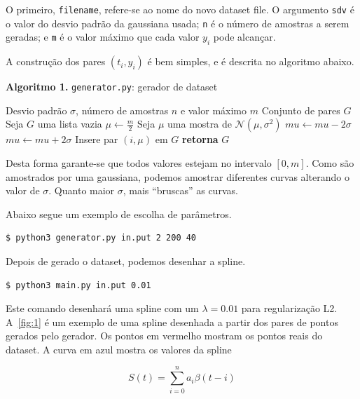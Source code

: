 \documentclass[12pt]{article}
\theoremstyle{plain}
\numberwithin{equation}{section}
\newcommand{\code}[1]{\lstinline[mathescape=true]{#1}}
\begin{document}
O primeiro, \code{filename}, refere-se ao nome do novo dataset file. O argumento \code{sdv} é o
valor do desvio padrão da gaussiana usada; \code{n} é o número de amostras a serem geradas; e
\code{m} é o valor máximo que cada valor $y_i$ pode alcançar.

A construção dos pares $(t_i,y_i)$ é bem simples, e é descrita no algoritmo abaixo.

\begin{algorithm}[h]
  \caption*{\textbf{Algoritmo 1.} \code{generator.py}: gerador de dataset}
  \begin{algorithmic}[1]
    \Require Desvio padrão $\sigma$, número de amostras $n$ e valor máximo $m$
    \Ensure Conjunto de pares $G$
    \State Seja $G$ uma lista vazia
    \State $\mu\gets \frac{m}{2}$
    \For{inteiro $i$ no intervalo $[0,n)$}
      \State Seja $\mu$ uma mostra de $\mathcal{N}(\mu,\sigma^2)$
        \State $mu\gets mu - 2\sigma$
        \State $mu\gets mu + 2\sigma$
      \EndIf
      \State Insere par $(i, \mu)$ em $G$
    \EndFor%
    \State\textbf{retorna} $G$
  \end{algorithmic}
\end{algorithm}

Desta forma garante-se que todos valores estejam no intervalo $[0, m]$. Como são amostrados por uma
gaussiana, podemos amostrar diferentes curvas alterando o valor de $\sigma$. Quanto maior $\sigma$,
mais ``bruscas'' as curvas.

Abaixo segue um exemplo de escolha de parâmetros.

\begin{lstlisting}[numbers=none]
$ python3 generator.py in.put 2 200 40
\end{lstlisting}

Depois de gerado o dataset, podemos desenhar a spline.

\begin{lstlisting}[numbers=none]
$ python3 main.py in.put 0.01
\end{lstlisting}

Este comando desenhará uma spline com um $\lambda=0.01$ para regularização L2. A~\autoref{fig:1} é
um exemplo de uma spline desenhada a partir dos pares de pontos gerados pelo gerador. Os pontos em
vermelho mostram os pontos reais do dataset. A curva em azul mostra os valores da spline

\begin{equation*}
  S(t)=\sum_{i=0}^n a_i\beta(t-i)
\end{equation*}
\end{document}
